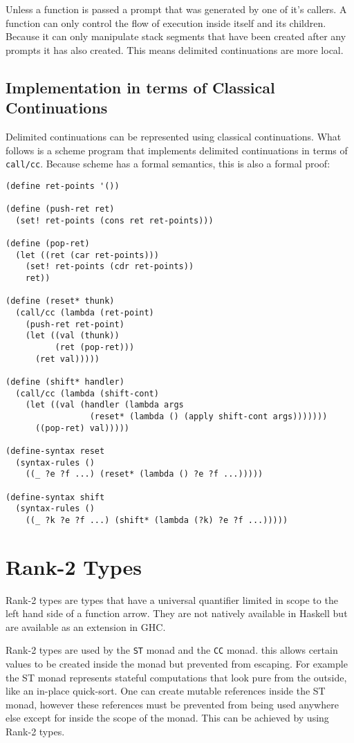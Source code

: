 \documentclass[]{article}
\newcommand{\function}[1]{\texttt{#1}}
\newcommand{\type}[1]{\texttt{#1}}
\begin{document}
Unless a function is passed a prompt that was generated by one of it's
callers. A function can only control the flow of execution inside itself and
its children. Because it can only manipulate stack segments that have been
created after any prompts it has also created. This means delimited
continuations are more local.

\subsection{Implementation in terms of Classical Continuations}
Delimited continuations can be represented using classical continuations. What
follows is a scheme program that implements delimited continuations in terms
of \function{call/cc}. Because scheme has a formal semantics, this is also a
formal proof:

\begin{verbatim}
(define ret-points '())

(define (push-ret ret)
  (set! ret-points (cons ret ret-points)))

(define (pop-ret)
  (let ((ret (car ret-points)))
    (set! ret-points (cdr ret-points))
    ret))

(define (reset* thunk)
  (call/cc (lambda (ret-point)
    (push-ret ret-point)
    (let ((val (thunk))
          (ret (pop-ret)))
      (ret val)))))

(define (shift* handler)
  (call/cc (lambda (shift-cont)
    (let ((val (handler (lambda args
                 (reset* (lambda () (apply shift-cont args)))))))
      ((pop-ret) val)))))

(define-syntax reset
  (syntax-rules ()
    ((_ ?e ?f ...) (reset* (lambda () ?e ?f ...)))))

(define-syntax shift
  (syntax-rules ()
    ((_ ?k ?e ?f ...) (shift* (lambda (?k) ?e ?f ...)))))
\end{verbatim}

\section{Rank-2 Types}
\label{discussion:rank2}

Rank-2 types are types that have a universal quantifier limited in scope to
the left hand side of a function arrow. They are not natively available in
Haskell but are available as an extension in GHC.

Rank-2 types are used by the \type{ST} monad and the \type{CC} monad. this
allows certain values to be created inside the monad but prevented from
escaping. For example the ST monad represents stateful computations that look
pure from the outside, like an in-place quick-sort. One can create mutable
references inside the ST monad, however these references must be prevented
from being used anywhere else except for inside the scope of the monad.
This can be achieved by using Rank-2 types.
\end{document}
